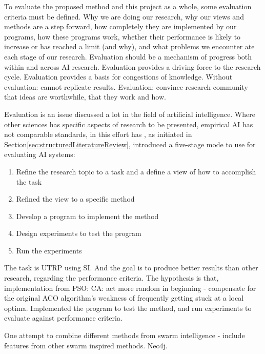 
To evaluate the proposed method and this project as a whole, some evaluation criteria must be defined. Why we are doing our research, why our views and methods are a step forward, how completely they are implemented by our programs, how these programs work, whether their performance is likely to increase or has reached a limit (and why), and what problems we encounter ate each stage of our research. Evaluation should be a mechanism of progress both within and across AI research. Evaluation provides a driving force to the research cycle. Evaluation provides a basis for congestions of knowledge. Without evaluation: cannot replicate results. Evaluation: convince research community that ideas are worthwhile, that they work and how. 

Evaluation is an issue discussed a lot in the field of artificial intelligence. Where other sciences has specific aspects of research to be presented, empirical AI has not comparable standards, in this effort has \citet{cohen88}, as initiated in Section\vref{sec:structuredLiteratureReview}, introduced a five-stage mode to use for evaluating AI systems: 
\begin{enumerate}
\item Refine the research topic to a task and a define a view of how to accomplish the task
\item Refined the view to a specific method
\item Develop a program to implement the method
\item Design experiments to test the program
\item Run the experiments
\end{enumerate} 
 
The task is UTRP using SI. 
And the goal is to produce better results than other research, regarding the performance criteria.  
The hypothesis is that, implementation from PSO: CA: act more random in beginning - compensate for the original ACO algorithm's weakness of frequently getting stuck at a local optima. Implemented the program to test the method, and run experiments to evaluate against performance criteria.

One attempt to combine different methods from swarm intelligence - include features from other swarm inspired methods. Neo4j.
